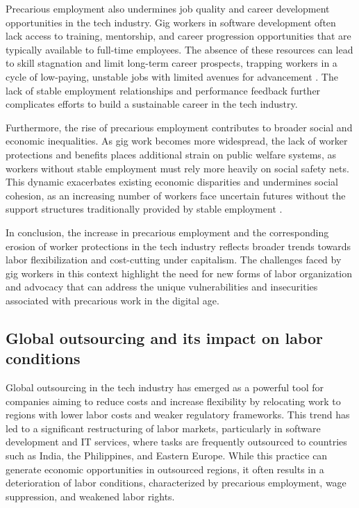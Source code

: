 Precarious employment also undermines job quality and career development opportunities in the tech industry. Gig workers in software development often lack access to training, mentorship, and career progression opportunities that are typically available to full-time employees. The absence of these resources can lead to skill stagnation and limit long-term career prospects, trapping workers in a cycle of low-paying, unstable jobs with limited avenues for advancement \cite[pp.~209-212]{kalleberg2009precarious}. The lack of stable employment relationships and performance feedback further complicates efforts to build a sustainable career in the tech industry.

Furthermore, the rise of precarious employment contributes to broader social and economic inequalities. As gig work becomes more widespread, the lack of worker protections and benefits places additional strain on public welfare systems, as workers without stable employment must rely more heavily on social safety nets. This dynamic exacerbates existing economic disparities and undermines social cohesion, as an increasing number of workers face uncertain futures without the support structures traditionally provided by stable employment \cite[pp.~143-146]{lee2015working}.

In conclusion, the increase in precarious employment and the corresponding erosion of worker protections in the tech industry reflects broader trends towards labor flexibilization and cost-cutting under capitalism. The challenges faced by gig workers in this context highlight the need for new forms of labor organization and advocacy that can address the unique vulnerabilities and insecurities associated with precarious work in the digital age.

\subsection{Global outsourcing and its impact on labor conditions}

Global outsourcing in the tech industry has emerged as a powerful tool for companies aiming to reduce costs and increase flexibility by relocating work to regions with lower labor costs and weaker regulatory frameworks. This trend has led to a significant restructuring of labor markets, particularly in software development and IT services, where tasks are frequently outsourced to countries such as India, the Philippines, and Eastern Europe. While this practice can generate economic opportunities in outsourced regions, it often results in a deterioration of labor conditions, characterized by precarious employment, wage suppression, and weakened labor rights.

